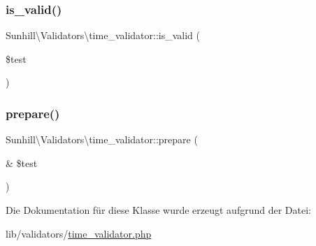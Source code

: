 \subsubsection{\texorpdfstring{is\+\_\+valid()}{is\_valid()}}
{\footnotesize\ttfamily Sunhill\textbackslash{}\+Validators\textbackslash{}time\+\_\+validator\+::is\+\_\+valid (\begin{DoxyParamCaption}\item[{}]{\$test }\end{DoxyParamCaption})\hspace{0.3cm}{\ttfamily [protected]}}

\mbox{\label{classSunhill_1_1Validators_1_1time__validator_a2058db27cb8583e4e3535449d7caa26b}} 
\subsubsection{\texorpdfstring{prepare()}{prepare()}}
{\footnotesize\ttfamily Sunhill\textbackslash{}\+Validators\textbackslash{}time\+\_\+validator\+::prepare (\begin{DoxyParamCaption}\item[{\&}]{\$test }\end{DoxyParamCaption})\hspace{0.3cm}{\ttfamily [protected]}}



Die Dokumentation für diese Klasse wurde erzeugt aufgrund der Datei\+:\begin{DoxyCompactItemize}
\item 
lib/validators/\hyperlink{time__validator_8php}{time\+\_\+validator.\+php}\end{DoxyCompactItemize}
